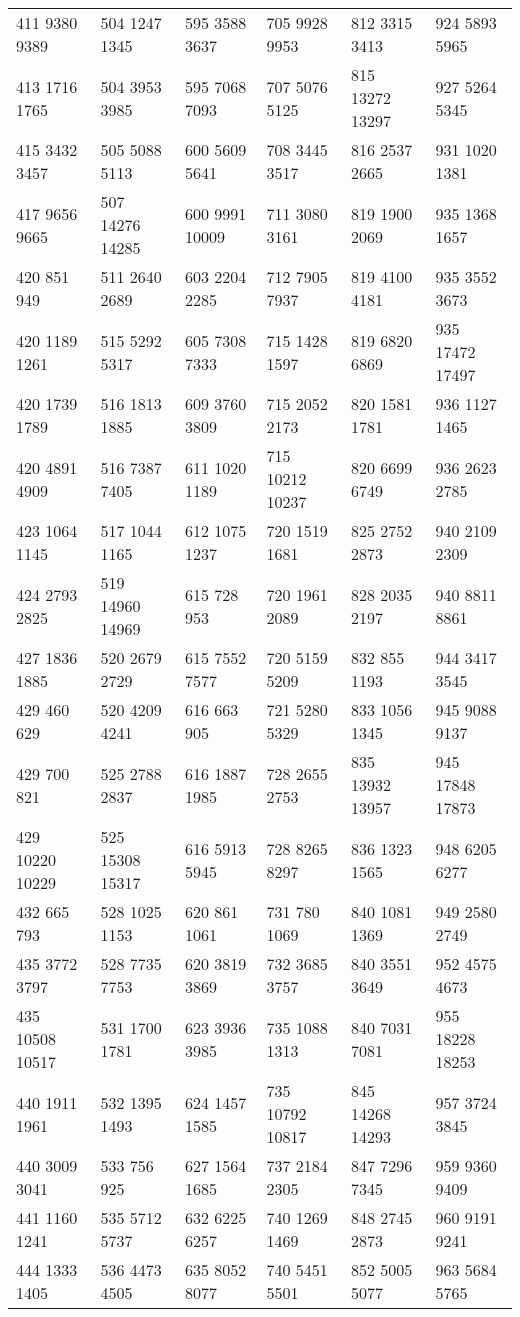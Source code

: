 \begin{center}
\begin{longtable}{llllll}
411 9380 9389&504 1247 1345&595 3588 3637&705 9928 9953&812 3315 3413&924 5893 5965\\
413 1716 1765&504 3953 3985&595 7068 7093&707 5076 5125&815 13272 13297&927 5264 5345\\
415 3432 3457&505 5088 5113&600 5609 5641&708 3445 3517&816 2537 2665&931 1020 1381\\
417 9656 9665&507 14276 14285&600 9991 10009&711 3080 3161&819 1900 2069&935 1368 1657\\
420 851 949&511 2640 2689&603 2204 2285&712 7905 7937&819 4100 4181&935 3552 3673\\
420 1189 1261&515 5292 5317&605 7308 7333&715 1428 1597&819 6820 6869&935 17472 17497\\
420 1739 1789&516 1813 1885&609 3760 3809&715 2052 2173&820 1581 1781&936 1127 1465\\
420 4891 4909&516 7387 7405&611 1020 1189&715 10212 10237&820 6699 6749&936 2623 2785\\
423 1064 1145&517 1044 1165&612 1075 1237&720 1519 1681&825 2752 2873&940 2109 2309\\
424 2793 2825&519 14960 14969&615 728 953&720 1961 2089&828 2035 2197&940 8811 8861\\
427 1836 1885&520 2679 2729&615 7552 7577&720 5159 5209&832 855 1193&944 3417 3545\\
429 460 629&520 4209 4241&616 663 905&721 5280 5329&833 1056 1345&945 9088 9137\\
429 700 821&525 2788 2837&616 1887 1985&728 2655 2753&835 13932 13957&945 17848 17873\\
429 10220 10229&525 15308 15317&616 5913 5945&728 8265 8297&836 1323 1565&948 6205 6277\\
432 665 793&528 1025 1153&620 861 1061&731 780 1069&840 1081 1369&949 2580 2749\\
435 3772 3797&528 7735 7753&620 3819 3869&732 3685 3757&840 3551 3649&952 4575 4673\\
435 10508 10517&531 1700 1781&623 3936 3985&735 1088 1313&840 7031 7081&955 18228 18253\\
440 1911 1961&532 1395 1493&624 1457 1585&735 10792 10817&845 14268 14293&957 3724 3845\\
440 3009 3041&533 756 925&627 1564 1685&737 2184 2305&847 7296 7345&959 9360 9409\\
441 1160 1241&535 5712 5737&632 6225 6257&740 1269 1469&848 2745 2873&960 9191 9241\\
444 1333 1405&536 4473 4505&635 8052 8077&740 5451 5501&852 5005 5077&963 5684 5765\\

\end{longtable}
\end{center}
